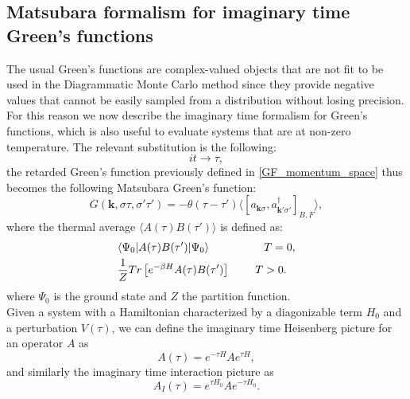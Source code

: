 \subsection{Matsubara formalism for imaginary time Green's functions}
The usual Green's functions are complex-valued objects that are not fit to be used in the Diagrammatic Monte Carlo method since they provide 
negative values that cannot be easily sampled from a distribution without losing precision.\\
For this reason we now describe the imaginary time formalism for Green's functions, which is also useful to evaluate systems that are 
at non-zero temperature. The relevant substitution is the following:
\begin{equation}
    it\to \tau,
    \label{imaginary_time_substitution}
\end{equation}
the retarded Green's function previously defined in \ref{GF_momentum_space} thus becomes the following Matsubara Green's function:
\begin{equation}
    G(\mathbf{k},\sigma\tau,\sigma'\tau')=-\theta(\tau-\tau')\langle [a_{\mathbf{k}\sigma},a^\dagger_{\mathbf{k}'\sigma'}]_{B,F}\rangle,
\end{equation}
where the thermal average $\langle A(\tau)B(\tau')\rangle$ is defined as:
\begin{equation}
\begin{split}
    &\langle \Psi_0|A(\tau)B(\tau')|\Psi_0\rangle\hspace{1.75cm}T=0,\\
    &\frac{1}{Z}Tr\left[e^{-\beta H}A(\tau)B(\tau')\right]\hspace{0.8cm}T>0.
\end{split}
\end{equation}
where $\Psi_0$ is the ground state and $Z$ the partition function.\\
Given a system with a Hamiltonian characterized by a diagonizable term $H_0$ and a perturbation $V(\tau)$, we can define the imaginary time 
Heisenberg picture for an operator $A$ as 
\begin{equation}
    A(\tau)=e^{-\tau H}Ae^{\tau H},
\end{equation}
and similarly the imaginary time interaction picture as
\begin{equation}
    A_I(\tau)=e^{\tau H_0}Ae^{-\tau H_0}.
\end{equation}

